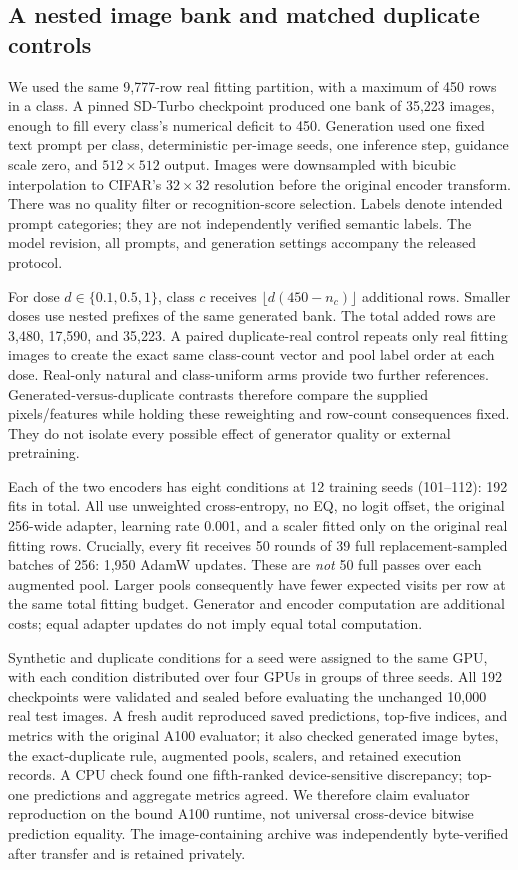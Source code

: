\documentclass[conference]{IEEEtran}
\begin{document}
\subsection{A nested image bank and matched duplicate controls}
We used the same 9,777-row real fitting partition, with a maximum of 450 rows in a class. A pinned SD-Turbo checkpoint \cite{sdturbo} produced one bank of 35,223 images, enough to fill every class's numerical deficit to 450. Generation used one fixed text prompt per class, deterministic per-image seeds, one inference step, guidance scale zero, and $512\times512$ output. Images were downsampled with bicubic interpolation to CIFAR's $32\times32$ resolution before the original encoder transform. There was no quality filter or recognition-score selection. Labels denote intended prompt categories; they are not independently verified semantic labels. The model revision, all prompts, and generation settings accompany the released protocol.

For dose $d\in\{0.1,0.5,1\}$, class $c$ receives $\lfloor d(450-n_c)\rfloor$ additional rows. Smaller doses use nested prefixes of the same generated bank. The total added rows are 3,480, 17,590, and 35,223. A paired duplicate-real control repeats only real fitting images to create the exact same class-count vector and pool label order at each dose. Real-only natural and class-uniform arms provide two further references. Generated-versus-duplicate contrasts therefore compare the supplied pixels/features while holding these reweighting and row-count consequences fixed. They do not isolate every possible effect of generator quality or external pretraining.

Each of the two encoders has eight conditions at 12 training seeds (101--112): 192 fits in total. All use unweighted cross-entropy, no EQ, no logit offset, the original 256-wide adapter, learning rate 0.001, and a scaler fitted only on the original real fitting rows. Crucially, every fit receives 50 rounds of 39 full replacement-sampled batches of 256: 1,950 AdamW updates. These are \emph{not} 50 full passes over each augmented pool. Larger pools consequently have fewer expected visits per row at the same total fitting budget. Generator and encoder computation are additional costs; equal adapter updates do not imply equal total computation.

Synthetic and duplicate conditions for a seed were assigned to the same GPU, with each condition distributed over four GPUs in groups of three seeds. All 192 checkpoints were validated and sealed before evaluating the unchanged 10,000 real test images. A fresh audit reproduced saved predictions, top-five indices, and metrics with the original A100 evaluator; it also checked generated image bytes, the exact-duplicate rule, augmented pools, scalers, and retained execution records. A CPU check found one fifth-ranked device-sensitive discrepancy; top-one predictions and aggregate metrics agreed. We therefore claim evaluator reproduction on the bound A100 runtime, not universal cross-device bitwise prediction equality. The image-containing archive was independently byte-verified after transfer and is retained privately.
\end{document}
